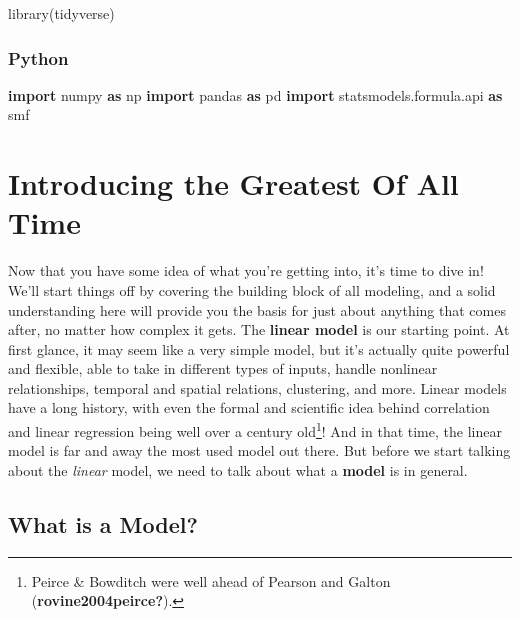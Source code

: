 \documentclass[
  letterpaper,
]{krantz}
\newenvironment{Shaded}{}{}
\newcommand{\FunctionTok}[1]{\textcolor[rgb]{0.02,0.16,0.49}{#1}}
\newcommand{\ImportTok}[1]{\textcolor[rgb]{0.00,0.50,0.00}{\textbf{#1}}}
\newcommand{\NormalTok}[1]{#1}
\begin{document}
\begin{Shaded}
\begin{Highlighting}[]
\FunctionTok{library}\NormalTok{(tidyverse)}
\end{Highlighting}
\end{Shaded}

\subsubsection{Python}

\begin{Shaded}
\begin{Highlighting}[]
\ImportTok{import}\NormalTok{ numpy }\ImportTok{as}\NormalTok{ np}
\ImportTok{import}\NormalTok{ pandas }\ImportTok{as}\NormalTok{ pd}
\ImportTok{import}\NormalTok{ statsmodels.formula.api }\ImportTok{as}\NormalTok{ smf}
\end{Highlighting}
\end{Shaded}

\section{Introducing the Greatest Of All
Time}\label{introducing-the-greatest-of-all-time}

Now that you have some idea of what you're getting into, it's time to
dive in! We'll start things off by covering the building block of all
modeling, and a solid understanding here will provide you the basis for
just about anything that comes after, no matter how complex it gets. The
\textbf{linear model} is our starting point. At first glance, it may
seem like a very simple model, but it's actually quite powerful and
flexible, able to take in different types of inputs, handle nonlinear
relationships, temporal and spatial relations, clustering, and more.
Linear models have a long history, with even the formal and scientific
idea behind correlation and linear regression being well over a century
old\footnote{Peirce \& Bowditch were well ahead of Pearson and Galton
  (\textbf{rovine2004peirce?}).}! And in that time, the linear model is
far and away the most used model out there. But before we start talking
about the \emph{linear} model, we need to talk about what a
\textbf{model} is in general.

\subsection{What is a Model?}\label{what-is-a-model}
\end{document}
